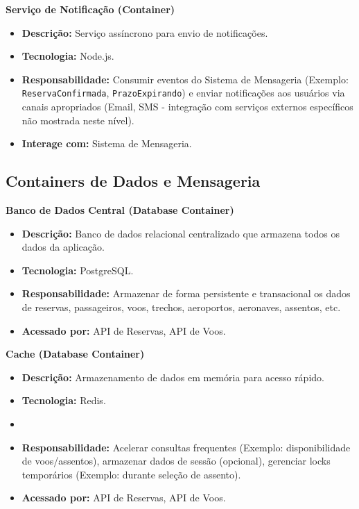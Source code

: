 \textbf{Serviço de Notificação (Container)}
\begin{itemize}
    \item \textbf{Descrição:} Serviço assíncrono para envio de notificações.
    \item \textbf{Tecnologia:} Node.js.
    \item \textbf{Responsabilidade:} Consumir eventos do Sistema de Mensageria (Exemplo: \texttt{ReservaConfirmada}, \texttt{PrazoExpirando}) e enviar notificações aos usuários via canais apropriados (Email, SMS - integração com serviços externos específicos não mostrada neste nível).
    \item \textbf{Interage com:} Sistema de Mensageria.
\end{itemize}

\subsection{Containers de Dados e Mensageria}
\label{subsec:c4-container-dados}

\textbf{Banco de Dados Central (Database Container)}
\begin{itemize}
    \item \textbf{Descrição:} Banco de dados relacional centralizado que armazena todos os dados da aplicação.
    \item \textbf{Tecnologia:} PostgreSQL.
    \item \textbf{Responsabilidade:} Armazenar de forma persistente e transacional os dados de reservas, passageiros, voos, trechos, aeroportos, aeronaves, assentos, etc.
    \item \textbf{Acessado por:} API de Reservas, API de Voos.
\end{itemize}

\textbf{Cache (Database Container)}
\begin{itemize}
    \item \textbf{Descrição:} Armazenamento de dados em memória para acesso rápido.
    \item \textbf{Tecnologia:} Redis.
    \item \item \textbf{Responsabilidade:} Acelerar consultas frequentes (Exemplo: disponibilidade de voos/assentos), armazenar dados de sessão (opcional), gerenciar locks temporários (Exemplo: durante seleção de assento).
    \item \textbf{Acessado por:} API de Reservas, API de Voos.
\end{itemize}

